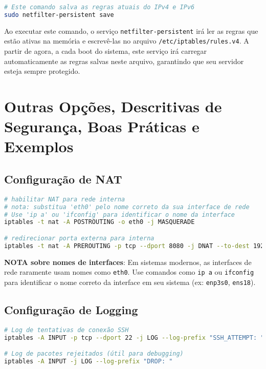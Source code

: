﻿\documentclass[12pt,fleqn]{article}
\begin{document}
\begin{lstlisting}[language=bash, caption=Salvando as regras para persistência]
# Este comando salva as regras atuais do IPv4 e IPv6
sudo netfilter-persistent save
\end{lstlisting}

Ao executar este comando, o serviço \texttt{netfilter-persistent} irá ler as regras que estão ativas na memória e escrevê-las no arquivo \texttt{/etc/iptables/rules.v4}. A partir de agora, a cada boot do sistema, este serviço irá carregar automaticamente as regras salvas neste arquivo, garantindo que seu servidor esteja sempre protegido.

\section{Outras Opções, Descritivas de Segurança, Boas Práticas e Exemplos}

\subsection{Configuração de NAT}

\begin{lstlisting}[language=bash, caption=Configuração de NAT]
# habilitar NAT para rede interna
# nota: substitua 'eth0' pelo nome correto da sua interface de rede
# Use 'ip a' ou 'ifconfig' para identificar o nome da interface
iptables -t nat -A POSTROUTING -o eth0 -j MASQUERADE

# redirecionar porta externa para interna
iptables -t nat -A PREROUTING -p tcp --dport 8080 -j DNAT --to-dest 192.168.1.100:80
\end{lstlisting}

\textbf{NOTA sobre nomes de interfaces}: Em sistemas modernos, as interfaces de rede raramente usam nomes como \texttt{eth0}. Use comandos como \texttt{ip a} ou \texttt{ifconfig} para identificar o nome correto da interface em seu sistema (ex: \texttt{enp3s0}, \texttt{ens18}).

\subsection{Configuração de Logging}

\begin{lstlisting}[language=bash, caption=Configuração de logs]
# Log de tentativas de conexão SSH
iptables -A INPUT -p tcp --dport 22 -j LOG --log-prefix "SSH_ATTEMPT: "

# Log de pacotes rejeitados (útil para debugging)
iptables -A INPUT -j LOG --log-prefix "DROP: "
\end{lstlisting}
\end{document}
